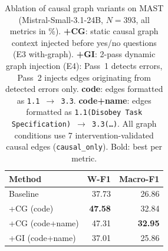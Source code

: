 \begin{table}[t]
\centering
\small
\setlength{\tabcolsep}{6pt}
\renewcommand{\arraystretch}{1.2}
\begin{tabular}{l rr}
\toprule
\textbf{Method} & \textbf{W-F1} & \textbf{Macro-F1} \\
\midrule
Baseline                  & 37.73          & 26.86 \\
+CG (code)                & \textbf{47.58} & 32.84 \\
+CG (code+name)           &        47.31  & \textbf{32.95} \\
+GI (code+name)           & 37.01          & 25.86 \\
\bottomrule
\end{tabular}
\caption{%
  Ablation of causal graph variants on MAST
  (Mistral-Small-3.1-24B, $N{=}393$, all metrics in \%).
  \textbf{+CG}: static causal graph context injected before yes/no questions (E3 with-graph).
  \textbf{+GI}: 2-pass dynamic graph injection (E4): Pass~1 detects errors,
  Pass~2 injects edges originating from detected errors only.
  \textbf{code}: edges formatted as \texttt{1.1\,$\rightarrow$\,3.3}.
  \textbf{code+name}: edges formatted as
  \texttt{1.1(Disobey Task Specification)\,$\rightarrow$\,3.3(\ldots)}.
  All graph conditions use 7 intervention-validated causal edges (\texttt{causal\_only}).
  Bold: best per metric.%
}
\label{tab:ablation_methods}
\end{table}

